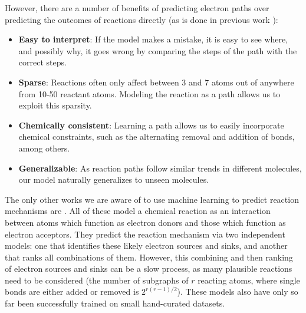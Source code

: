 However, there are a number of benefits of predicting electron paths over predicting the outcomes of reactions directly (as is done in previous work \cite{jin2017predicting,schwaller2017found}):
\begin{itemize}
\item \textbf{Easy to interpret}: If the model makes a mistake, it is easy to see where, and possibly why, it goes wrong by comparing the steps of the path with the correct steps.
\item \textbf{Sparse}: Reactions often only affect between 3 and 7 atoms out of anywhere from 10-50 reactant atoms. Modeling the reaction as a path allows us to exploit this sparsity.
\item \textbf{Chemically consistent}: Learning a path allows us to easily incorporate chemical constraints, such as the alternating removal and addition of bonds, among others. 
\item \textbf{Generalizable}: As reaction paths follow similar trends in different molecules, our model naturally generalizes to unseen molecules. %
\end{itemize}
The only other works we are aware of to use machine learning to predict reaction mechanisms are \cite{fooshee2018deep,kayala2012reactionpredictor,kayala2011learning, NIPS2011_4356}.
All of these model a chemical reaction as an interaction between atoms which function as electron donors and those which function as electron acceptors.
 They predict the reaction mechanism via two independent models: one that identifies these likely electron sources and sinks, and another that ranks all combinations of them.
However, this combining and then ranking of electron sources and sinks can be a slow process, as many plausible reactions need to be considered (the number of subgraphs of $r$ reacting atoms, where single bonds are either added or removed is $2^{r(r-1)/2}$).
These models also have only so far been successfully trained on small hand-curated datasets.


